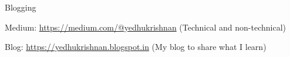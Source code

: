 {}
\begin{cventries}
  \cventry
    {Blogging}%
    {}
    {}
    {}
    {
      \begin{cvitems}
        \item {Medium: \href{https://medium.com/@yedhukrishnan}{https://medium.com/@yedhukrishnan} (Technical and non-technical)}
        \item {Blog: \href{https://yedhukrishnan.blogspot.in}{https://yedhukrishnan.blogspot.in} (My blog to share what I learn)}
      \end{cvitems}
    }
\end{cventries}
